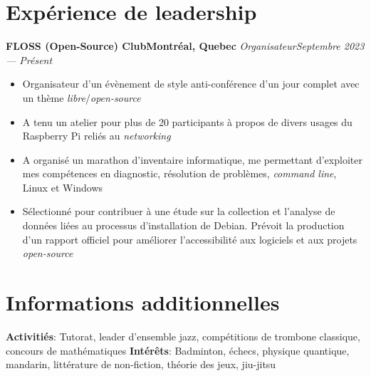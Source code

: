 \documentclass{article}
\newcommand{\newrole}[4]{
    {\normalfont\bfseries #1\hfill#3}
    \newline
    \textit{#2}\hfill\textit{#4}
}
\newenvironment{bulletpoints}{\vspace*{-0.2em}\begin{itemize}\setlength\itemsep{-0.3em}}{\end{itemize}}
\begin{document}
\section*{Expérience de leadership}
\newrole{FLOSS (Open-Source) Club}{Organisateur}{Montréal, Quebec}{Septembre 2023 --- Présent}
\begin{bulletpoints}
    \item Organisateur d’un évènement de style anti-conférence d’un jour complet avec un thème \textit{libre}/\textit{open-source}
    \item A tenu un atelier pour plus de 20 participants à propos de divers usages du Raspberry Pi reliés au \textit{networking}
    \item A organisé un marathon d’inventaire informatique, me permettant d’exploiter mes compétences en diagnostic, résolution de problèmes, \textit{command line}, Linux et Windows
    \item Sélectionné pour contribuer à une étude sur la collection et l’analyse de données liées au processus d’installation de Debian. Prévoit la production d’un rapport officiel pour améliorer l’accessibilité aux logiciels et aux projets \textit{open-source}
\end{bulletpoints}


\section*{Informations additionnelles}
{\bfseries Activitiés}: Tutorat, leader d’ensemble jazz, compétitions de trombone classique, concours de mathématiques
\newline
{\bfseries Intérêts}: Badminton, échecs, physique quantique, mandarin, littérature de non-fiction, théorie des jeux, jiu-jitsu
\end{document}

